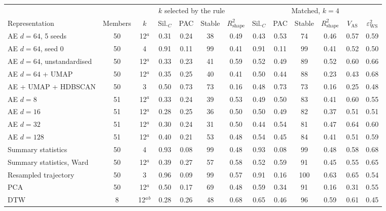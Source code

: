 \begin{tabular}{lcccccccccccc}\toprule
 & & \multicolumn{5}{c}{$k$ selected by the rule} & \multicolumn{6}{c}{Matched, $k=4$} \\ \cmidrule(lr){3-7}\cmidrule(lr){8-13}
Representation & Members & $k$ & Sil.$_C$ & PAC & Stable & $R^2_{\mathrm{shape}}$ & Sil.$_C$ & PAC & Stable & $R^2_{\mathrm{shape}}$ & $V_{\mathrm{AS}}$ & $\varepsilon^2_{\mathrm{WS}}$ \\ \midrule
AE $d=64$, 5 seeds & 50 & 12$^a$ & 0.31 & 0.24 & 38 & 0.49 & 0.43 & 0.53 & 74 & 0.46 & 0.57 & 0.59 \\
AE $d=64$, seed 0 & 50 & 4 & 0.91 & 0.11 & 99 & 0.41 & 0.91 & 0.11 & 99 & 0.41 & 0.52 & 0.50 \\
AE $d=64$, unstandardised & 50 & 12$^a$ & 0.33 & 0.23 & 41 & 0.59 & 0.52 & 0.49 & 89 & 0.52 & 0.60 & 0.66 \\
AE $d=64$ + UMAP & 50 & 12$^a$ & 0.35 & 0.25 & 40 & 0.41 & 0.50 & 0.44 & 88 & 0.23 & 0.43 & 0.68 \\
AE + UMAP + HDBSCAN & 50 & 3 & 0.50 & 0.73 & 73 & 0.16 & 0.48 & 0.73 & 73 & 0.16 & 0.25 & 0.48 \\
AE $d=8$ & 51 & 12$^a$ & 0.33 & 0.24 & 39 & 0.53 & 0.49 & 0.50 & 83 & 0.41 & 0.60 & 0.55 \\
AE $d=16$ & 51 & 12$^a$ & 0.28 & 0.25 & 36 & 0.50 & 0.50 & 0.49 & 82 & 0.37 & 0.51 & 0.51 \\
AE $d=32$ & 51 & 12$^a$ & 0.30 & 0.24 & 31 & 0.50 & 0.44 & 0.54 & 81 & 0.47 & 0.64 & 0.60 \\
AE $d=128$ & 51 & 12$^a$ & 0.40 & 0.21 & 53 & 0.48 & 0.54 & 0.45 & 84 & 0.41 & 0.51 & 0.59 \\
Summary statistics & 50 & 4 & 0.93 & 0.08 & 99 & 0.48 & 0.93 & 0.08 & 99 & 0.48 & 0.58 & 0.68 \\
Summary statistics, Ward & 50 & 12$^a$ & 0.39 & 0.27 & 57 & 0.58 & 0.52 & 0.59 & 91 & 0.45 & 0.55 & 0.65 \\
Resampled trajectory & 50 & 3 & 0.96 & 0.09 & 99 & 0.57 & 0.91 & 0.16 & 100 & 0.63 & 0.65 & 0.54 \\
PCA & 50 & 12$^a$ & 0.50 & 0.17 & 69 & 0.48 & 0.59 & 0.34 & 91 & 0.16 & 0.31 & 0.55 \\
DTW & 8 & 12$^a$$^b$ & 0.28 & 0.26 & 48 & 0.68 & 0.65 & 0.46 & 96 & 0.59 & 0.61 & 0.45 \\
\bottomrule\end{tabular}